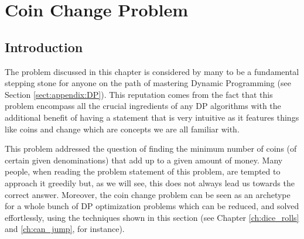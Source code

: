 %

\chapter{Coin Change Problem}
\label{ch:coin_change}
\section*{Introduction}
The problem discussed in this chapter is considered by many to be a fundamental stepping stone for anyone on the path of mastering Dynamic Programming (see Section \ref{sect:appendix:DP}).
This reputation comes from the fact that this problem encompass all the crucial ingredients of any DP algorithms with the additional benefit of having a statement that is very intuitive as 
it features things like coins and change which are concepts we are all familiar with.

This problem addressed the question of finding the minimum number of coins (of certain given denominations) that add up to a given amount of money. 
Many people, when reading the problem statement of this problem, are tempted to approach it greedily but, as we will see,  this does not always lead us towards the correct answer. 
Moreover, the coin change problem can be seen as an archetype for a whole bunch of DP optimization problems which can be reduced, and solved effortlessly, using the techniques shown in this section (see Chapter \ref{ch:dice_rolls} and \ref{ch:can_jump}, for instance).


